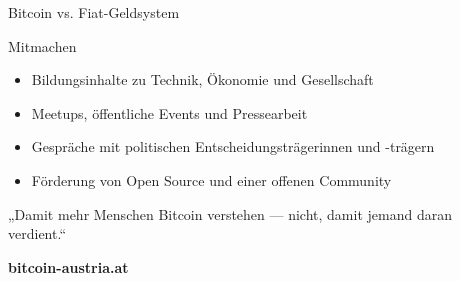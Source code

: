 \begin{frame}{Bitcoin vs. Fiat-Geldsystem}
  \centering
\end{frame}

\begin{frame}{Mitmachen}
  \begin{itemize}
    \item Bildungsinhalte zu Technik, Ökonomie und Gesellschaft
    \item Meetups, öffentliche Events und Pressearbeit
    \item Gespräche mit politischen Entscheidungsträgerinnen und -trägern
    \item Förderung von Open Source und einer offenen Community
  \end{itemize}

  \vfill
  \begin{center}
    „Damit mehr Menschen Bitcoin verstehen — nicht, damit jemand daran verdient.“

    \medskip
    \large \textbf{bitcoin-austria.at}
  \end{center}
\end{frame}


